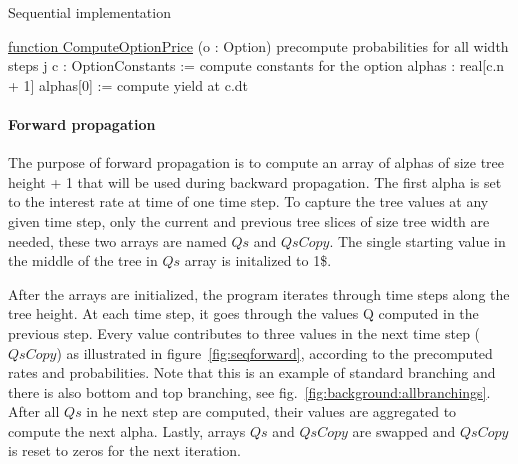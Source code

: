 \begin{algorithm}[H]
    \DontPrintSemicolon
    \caption{Sequential implementation\label{alg:sequential}}

    \underline{function ComputeOptionPrice} (o : Option)\;
    \;
    precompute probabilities for all width steps j\;
    c : OptionConstants := compute constants for the option\;
    \;
    alphas : real[c.n + 1]\;
    alphas[0] := compute yield at c.dt 
\end{algorithm}

\paragraph{Forward propagation}
The purpose of forward propagation is to compute an array of alphas of size tree height + 1 that will be used during backward propagation. The first alpha is set to the interest rate at time of one time step. To capture the tree values at any given time step, only the current and previous tree slices of size tree width are needed, these two arrays are named $\mathit{Qs}$ and $\mathit{QsCopy}$. The single starting value in the middle of the tree in $\mathit{Qs}$ array is initalized to 1\$.

After the arrays are initialized, the program iterates through time steps along the tree height. At each time step, it goes through the values Q computed in the previous step. Every value contributes to three values in the next time step ($\mathit{QsCopy}$) as illustrated in figure~\ref{fig:seqforward}, according to the precomputed rates and probabilities. Note that this is an example of standard branching and there is also bottom and top branching, see fig.~\ref{fig:background:allbranchings}. After all $\mathit{Qs}$ in he next step are computed, their values are aggregated to compute the next alpha. Lastly, arrays $\mathit{Qs}$ and $\mathit{QsCopy}$ are swapped and $\mathit{QsCopy}$ is reset to zeros for the next iteration.

